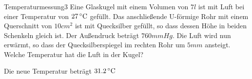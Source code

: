 



\begin{problem}{Temperaturmessung}{3}
Eine Glaskugel mit einem Volumen von $7\unit{l}$ ist mit Luft bei einer Temperatur
von $27\,^\circ\mathrm{C}$ gefüllt. Das anschließende U-förmige Rohr mit einem Querschnitt von $10\unit{cm^2}$
ist mit Quecksilber gefüllt, so dass dessen Höhe in beiden Schenkeln gleich ist. Der Außendruck
beträgt $760\unit{mmHg}$. Die Luft wird nun erwärmt, so dass der Quecksilberspiegel im rechten Rohr
um $5\unit{mm}$ ansteigt.\\
Welche Temperatur hat die Luft in der Kugel?
\begin{solution}
Die neue Temperatur beträgt $31.2\,^\circ\mathrm{C}$
\end{solution}
\end{problem}


